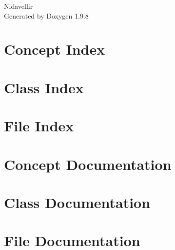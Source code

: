 \documentclass[twoside]{book}
\newcommand{\+}{\discretionary{\mbox{\scriptsize$\hookleftarrow$}}{}{}}
\newcommand{\clearemptydoublepage}{%
    \newpage{\pagestyle{empty}\cleardoublepage}%
  }
\begin{document}
  \raggedbottom
    \hypersetup{pageanchor=false,
                bookmarksnumbered=true,
                pdfencoding=unicode
               }
  \begin{titlepage}
  \vspace*{7cm}
  \begin{center}%
  {\Large Nidavellir}\\
  \vspace*{1cm}
  {\large Generated by Doxygen 1.9.8}\\
  \end{center}
  \end{titlepage}
  \clearemptydoublepage
  \tableofcontents
  \clearemptydoublepage
  \hypersetup{pageanchor=true}

\chapter{Concept Index}

\chapter{Class Index}

\chapter{File Index}

\chapter{Concept Documentation}

\chapter{Class Documentation}






\chapter{File Documentation}







  \backmatter
  \newpage
  \clearemptydoublepage
  \printindex
\end{document}

